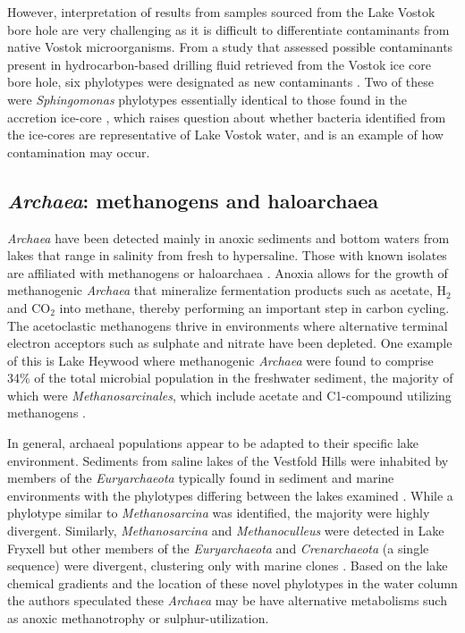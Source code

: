 However, interpretation of results from samples sourced from the Lake Vostok bore hole are very challenging as it is difficult to differentiate contaminants from native Vostok microorganisms.
From a study that assessed possible contaminants present in hydrocarbon-based drilling fluid retrieved from the Vostok ice core bore hole, 
six phylotypes were designated as new contaminants \cite{Alekhina2007}. 
Two of these were \emph{Sphingomonas} phylotypes essentially identical to those found in the accretion ice-core \cite{Christner2001},
 which raises question about whether bacteria identified from the ice-cores are representative of Lake Vostok water,
 and is an example of how contamination may occur.

\subsection{\emph{Archaea}: methanogens and haloarchaea}
\emph{Archaea} have been detected mainly in anoxic sediments and bottom waters from lakes that range in salinity from fresh to hypersaline.
Those with known isolates are affiliated with methanogens or haloarchaea \cite{Bowman2000a, Bowman2000b, Purdy2003, Coolen2004b, Kurosawa2010, Lauro2011}.
Anoxia allows for the growth of methanogenic \emph{Archaea} that mineralize fermentation products such as acetate, H$_2$ and CO$_2$ into methane, thereby performing an important step in carbon cycling.
The acetoclastic methanogens thrive in environments where alternative terminal electron acceptors such as sulphate and nitrate have been depleted. 
One example of this is Lake Heywood where methanogenic \emph{Archaea} were found to comprise 34\% of the total microbial population in the freshwater sediment, the majority of which were \emph{Methanosarcinales}, which include acetate and C1-compound utilizing methanogens \cite{Purdy2003}. 

In general, archaeal populations appear to be adapted to their specific lake environment.
Sediments from saline lakes of the Vestfold Hills were inhabited by members of the \emph{Euryarchaeota} typically found in sediment and marine environments with the phylotypes differing between the lakes examined \cite{Bowman2000b}. 
While a phylotype similar to \emph{Methanosarcina} was identified, the majority were highly divergent. 
Similarly, \emph{Methanosarcina} and \emph{Methanoculleus} were detected in Lake Fryxell but other members of the \emph{Euryarchaeota} and \emph{Crenarchaeota} (a single sequence) were divergent, clustering only with marine clones \cite{Karr2006}. 
Based on the lake chemical gradients and the location of these novel phylotypes in the water column the authors speculated these \emph{Archaea} may be have alternative metabolisms such as anoxic methanotrophy or sulphur-utilization. 

